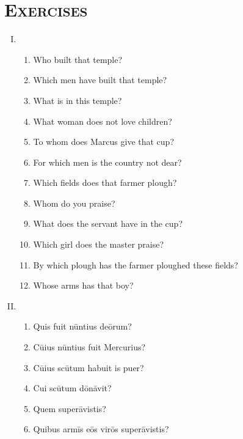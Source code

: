 \documentclass[12pt]{article}
\begin{document}
\section{\textsc{Exercises}}
\begin{enumerate}[I.]
	\setlength{\itemsep}{1em}
	\item \begin{enumerate}[1)]
		\item Who built that temple?
		\item Which men have built that temple?
		\item What is in this temple?
		\item What woman does not love children?
		\item To whom does Marcus give that cup?
		\item For which men is the country not dear?
		\item Which fields does that farmer plough?
		\item Whom do you praise?
		\item What does the servant have in the cup?
		\item Which girl does the master praise?
		\item By which plough has the farmer ploughed these fields?
		\item Whose arms has that boy?
	\end{enumerate}
	\item \begin{enumerate}[1)]
		\item Quis fuit nūntius deōrum?
		\item Cūius nūntius fuit Mercurius?
		\item Cūius scūtum habuit is puer?
		\item Cui scūtum dōnāvit?
		\item Quem superāvistis?
		\item Quibus armīs eōs virōs superāvistis?
	\end{enumerate}
\end{enumerate}
\end{document}
